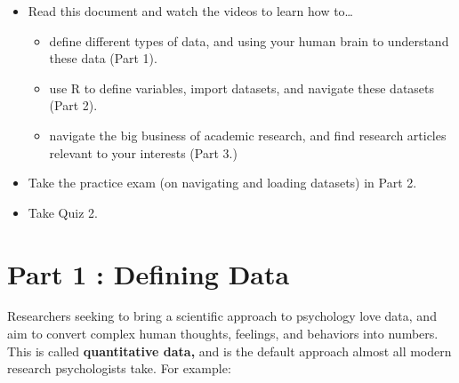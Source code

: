 \documentclass[
  letterpaper,
  DIV=11,
  numbers=noendperiod,
  oneside]{scrreprt}
\providecommand{\tightlist}{%
  \setlength{\itemsep}{0pt}\setlength{\parskip}{0pt}}\usepackage{longtable,booktabs,array}
\begin{document}
\begin{tcolorbox}[enhanced jigsaw, toptitle=1mm, toprule=.15mm, rightrule=.15mm, breakable, left=2mm, colbacktitle=quarto-callout-important-color!10!white, colback=white, opacityback=0, coltitle=black, bottomtitle=1mm, opacitybacktitle=0.6, titlerule=0mm, leftrule=.75mm, arc=.35mm, bottomrule=.15mm, title=\textcolor{quarto-callout-important-color}{\faExclamation}\hspace{0.5em}{To-Do List:}, colframe=quarto-callout-important-color-frame]

\begin{itemize}
\tightlist
\item
  Read this document and watch the videos to learn how to\ldots{}

  \begin{itemize}
  \tightlist
  \item
    define different types of data, and using your human brain to
    understand these data (Part 1).
  \item
    use R to define variables, import datasets, and navigate these
    datasets (Part 2).
  \item
    navigate the big business of academic research, and find research
    articles relevant to your interests (Part 3.)
  \end{itemize}
\item
  Take the practice exam (on navigating and loading datasets) in Part 2.
\item
  Take Quiz 2.
\end{itemize}

\end{tcolorbox}

\chapter{Part 1 : Defining Data}\label{part-1-defining-data}

Researchers seeking to bring a scientific approach to psychology love
data, and aim to convert complex human thoughts, feelings, and behaviors
into numbers. This is called \textbf{quantitative data,} and is the
default approach almost all modern research psychologists take. For
example:~
\end{document}
